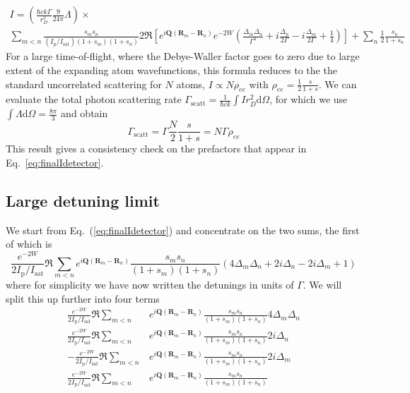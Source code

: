 \documentclass[11pt,letter]{article}
\newcommand{\bv}[1]{\ensuremath{\bm{#1}}}
\newcommand{\iisat}{\ensuremath{I_{\mathrm{p}}/I_{\mathrm{sat}}}}
\begin{document}
\begin{multline}
\label{eq:finalIdetector}
 I  =
 \left( 
 \frac{\hbar c k \Gamma}{r_{D}^{2}}  
     \frac{9}{24\pi} \Lambda 
  \right) \times \\
  \sum_{m<n} 
    \frac{ s_{m} s_{n} } 
         { (\iisat) ( 1+s_{m} )( 1+s_{n} ) }
    2 \Re\left[ 
               e^{ i \bv{Q}( \bv{R}_{m} - \bv{R}_{n} ) } e^{-2W}  
    \left(
        \frac{ \Delta_{m} \Delta_{n} }{ \Gamma^{2} } 
      + i \frac{ \Delta_{n} }{ 2 \Gamma } 
      - i \frac{ \Delta_{m} }{ 2 \Gamma } 
      + \frac{1}{4}  
    \right) \right]  
  + \sum_{n}  \frac{1}{2}
    \frac{ s_{n} } { 1 + s_{n} } 
\end{multline}
For a large time-of-flight, where the Debye-Waller factor goes to zero due to
large extent of the expanding atom wavefunctions, this formula reduces to the
the standard uncorrelated scattering for $N$ atoms, $I\propto N\rho_{ee}$ with
$\rho_{ee} = \frac{1}{2} \frac{s}{1+s}$.  We can evaluate the total photon
scattering rate  $\Gamma_{\mathrm{scatt}}= \frac{1}{\hbar c k}\int I r_{D}^{2}
\mathrm{d}\Omega $,  for which we use $\int \Lambda \mathrm{d} \Omega =
\frac{8\pi}{3}$ and obtain
\begin{equation}
\Gamma_{\mathrm{scatt}} =  \Gamma \frac{N}{2} \frac{s}{1+s} = N\Gamma \rho_{ee}
\end{equation}
This result gives a consistency check on the prefactors that appear in
Eq.~\ref{eq:finalIdetector}. 
 

\subsection{ Large detuning limit} 

We start from Eq.~(\ref{eq:finalIdetector}) and concentrate on the two sums,
the first of which is 
\begin{equation} 
  \frac{  e^{-2W}}{2\iisat} \Re 
  \sum_{m<n} 
               e^{ i \bv{Q}( \bv{R}_{m} - \bv{R}_{n} ) } 
    \frac{ s_{m} s_{n} } {( 1+s_{m} )( 1+s_{n} ) }
    \left(
         4\Delta_{m} \Delta_{n} 
      + 2i \Delta_{n} 
      - 2i \Delta_{m}
      + 1
    \right)  
\end{equation}
where for simplicity we have now written the detunings in units of $\Gamma$.
We will split this up further into four terms 
\begin{align} 
  \frac{  e^{-2W}}{2\iisat} \Re \sum_{m<n} & 
      e^{ i \bv{Q}( \bv{R}_{m} - \bv{R}_{n} ) } 
      \frac{ s_{m} s_{n} } {( 1+s_{m} )( 1+s_{n} ) } 4 \Delta_{m} \Delta_{n} \\
  \frac{  e^{-2W}}{2\iisat} \Re \sum_{m<n} & 
      e^{ i \bv{Q}( \bv{R}_{m} - \bv{R}_{n} ) } 
      \frac{ s_{m} s_{n} } {( 1+s_{m} )( 1+s_{n} ) } 2 i \Delta_{n}  \\
  -\frac{  e^{-2W}}{2\iisat} \Re \sum_{m<n} & 
      e^{ i \bv{Q}( \bv{R}_{m} - \bv{R}_{n} ) } 
      \frac{ s_{m} s_{n} } {( 1+s_{m} )( 1+s_{n} ) } 2 i \Delta_{m}  \\
  \frac{  e^{-2W}}{2\iisat} \Re \sum_{m<n} & 
      e^{ i \bv{Q}( \bv{R}_{m} - \bv{R}_{n} ) } 
      \frac{ s_{m} s_{n} } {( 1+s_{m} )( 1+s_{n} ) }   
\end{align}
\end{document}
